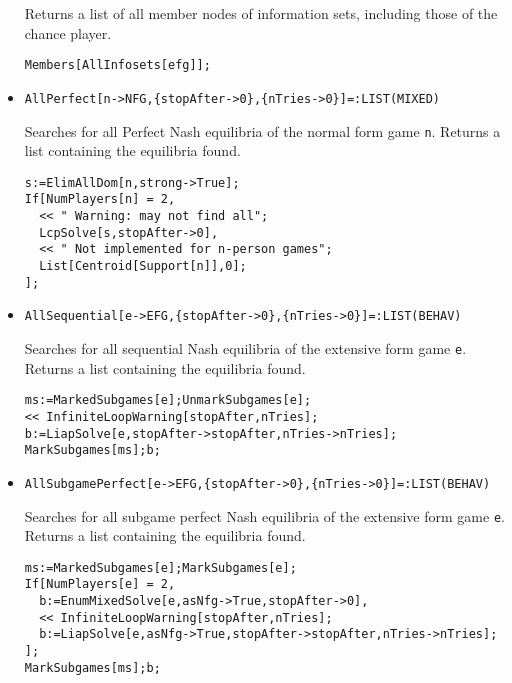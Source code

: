 \begin{itemize}
\bd 
Returns a list of all member nodes of information sets, including
those of the chance player.
\begin{verbatim}
Members[AllInfosets[efg]];
\end{verbatim} 
\ed

\item{}
\protect \large \begin{verbatim}
AllPerfect[n->NFG,{stopAfter->0},{nTries->0}]=:LIST(MIXED)
\end{verbatim}\normalsize

\bd 
Searches for all Perfect Nash equilibria of the normal form game
\verb+n+.  Returns a list containing the equilibria found.

\begin{verbatim}
s:=ElimAllDom[n,strong->True];
If[NumPlayers[n] = 2, 
  << " Warning: may not find all";
  LcpSolve[s,stopAfter->0],
  << " Not implemented for n-person games";
  List[Centroid[Support[n]],0];
];
\end{verbatim} 
\ed

\item{}
\protect \large \begin{verbatim}
AllSequential[e->EFG,{stopAfter->0},{nTries->0}]=:LIST(BEHAV)
\end{verbatim}\normalsize

\bd 
Searches for all sequential Nash equilibria of the extensive form
game \verb+e+.  Returns a list containing the equilibria found.

\begin{verbatim}
ms:=MarkedSubgames[e];UnmarkSubgames[e];
<< InfiniteLoopWarning[stopAfter,nTries];
b:=LiapSolve[e,stopAfter->stopAfter,nTries->nTries];
MarkSubgames[ms];b;
\end{verbatim} 
\ed

\item{}
\protect \large \begin{verbatim}
AllSubgamePerfect[e->EFG,{stopAfter->0},{nTries->0}]=:LIST(BEHAV)
\end{verbatim}\normalsize

\bd 
Searches for all subgame perfect Nash equilibria of the extensive
form game \verb+e+.  Returns a list containing the equilibria found.

\begin{verbatim}
ms:=MarkedSubgames[e];MarkSubgames[e];
If[NumPlayers[e] = 2, 
  b:=EnumMixedSolve[e,asNfg->True,stopAfter->0],
  << InfiniteLoopWarning[stopAfter,nTries];
  b:=LiapSolve[e,asNfg->True,stopAfter->stopAfter,nTries->nTries];
];
MarkSubgames[ms];b;
\end{verbatim} 
\ed


\end{itemize}
